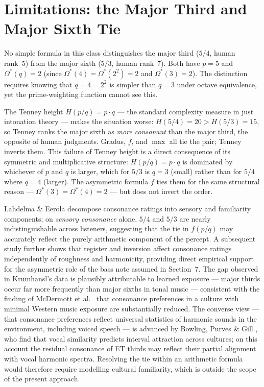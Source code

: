 \documentclass[11pt,a4paper]{article}
\newcommand{\Os}{\Omega^{\!*}}
\begin{document}

\section{Limitations: the Major Third and Major Sixth Tie}

No simple formula in this class distinguishes the major third ($5/4$, human
rank~5) from the major sixth ($5/3$, human rank~7). Both have $p = 5$ and
$\Os(q) = 2$ (since $\Os(4) = \Os(2^2) = 2$ and $\Os(3) = 2$). The
distinction requires knowing that $q = 4 = 2^2$ is simpler than $q = 3$
under octave equivalence, yet the prime-weighting function cannot see this.

The Tenney height $H(p/q) = p \cdot q$ \cite{tenney1988} --- the standard
complexity measure in just intonation theory --- makes the situation worse:
$H(5/4) = 20 > H(5/3) = 15$, so Tenney ranks the major sixth as
\emph{more consonant} than the major third, the opposite of human judgments.
Gradus, $f$, and $\max$ all tie the pair; Tenney inverts them.
This failure of Tenney height is a direct consequence of its symmetric and
multiplicative structure: $H(p/q) = p \cdot q$ is dominated by whichever of
$p$ and $q$ is larger, which for $5/3$ is $q = 3$ (small) rather than for
$5/4$ where $q = 4$ (larger). The asymmetric formula $f$ ties them for the
same structural reason --- $\Os(3) = \Os(4) = 2$ --- but does not
invert the order.

Lahdelma \& Eerola \cite{lahdelma2016} decompose consonance ratings into
sensory and familiarity components; on \emph{sensory consonance} alone,
$5/4$ and $5/3$ are nearly indistinguishable across listeners, suggesting
that the tie in $f(p/q)$ may accurately reflect the purely arithmetic
component of the percept. A subsequent study \cite{lahdelma2021} further
shows that register and inversion affect consonance ratings independently of
roughness and harmonicity, providing direct empirical support for the
asymmetric role of the bass note assumed in Section~7.
The gap observed in Krumhansl's data is plausibly
attributable to learned exposure --- major thirds occur far more frequently
than major sixths in tonal music --- consistent with the finding of McDermott et al.\ \cite{mcdermott2016} that
consonance preferences in a culture with minimal Western music exposure are
substantially reduced. The converse view --- that consonance preferences
reflect universal statistics of harmonic sounds in the environment, including
voiced speech --- is advanced by Bowling, Purves \& Gill \cite{bowling2018},
who find that vocal similarity predicts interval attraction across cultures;
on this account the residual consonance of ET thirds may reflect their
partial alignment with vocal harmonic spectra.
Resolving the tie within an arithmetic formula would therefore require
modelling cultural familiarity, which is outside the scope of the present
approach.
\end{document}
